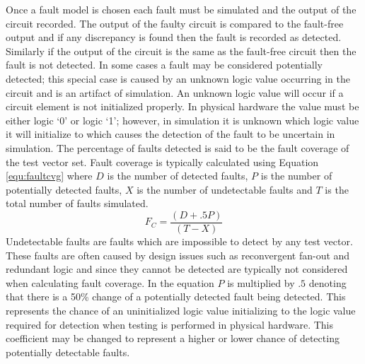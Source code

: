 \documentclass[12pt]{report}
\begin{document}
Once a fault model is chosen each fault must be simulated and the output of the circuit recorded.  The output of the faulty circuit is compared to the fault-free output and if any discrepancy is found then the fault is recorded as detected.  Similarly if the output of the circuit is the same as the fault-free circuit then the fault is not detected\cite{defectforcmos}.  In some cases a fault may be considered potentially detected; this special case is caused by an unknown logic value occurring in the circuit and is an artifact of simulation.  An unknown logic value will occur if a circuit element is not initialized properly\cite{stroud}.  In physical hardware the value must be either logic `0' or logic `1'; however, in simulation it is unknown which logic value it will initialize to which causes the detection of the fault to be uncertain in simulation\cite{stroud}.  The percentage of faults detected is said to be the fault coverage of the test vector set\cite{defectforcmos}\cite{stroud}.  Fault coverage is typically calculated using Equation \ref{equ:faultcvg} where $D$ is the number of detected faults, $P$ is the number of potentially detected faults, $X$ is the number of undetectable faults and $T$ is the total number of faults simulated\cite{stroud}.  
\begin{equation}
F_C = \frac{(D + .5P)}{(T - X)}
\label{equ:faultcvg}
\end{equation}
Undetectable faults are faults which are impossible to detect by any test vector.  These faults are often caused by design issues such as reconvergent fan-out and redundant logic\cite{stroud} and since they cannot be detected are typically not considered when calculating fault coverage.  In the equation $P$ is multiplied by $.5$ denoting that there is a 50\% change of a potentially detected fault being detected.  This represents the chance of an uninitialized logic value initializing to the logic value required for detection when testing is performed in physical hardware.  This coefficient may be changed to represent a higher or lower chance of detecting potentially detectable faults\cite{stroud}.
\end{document}
